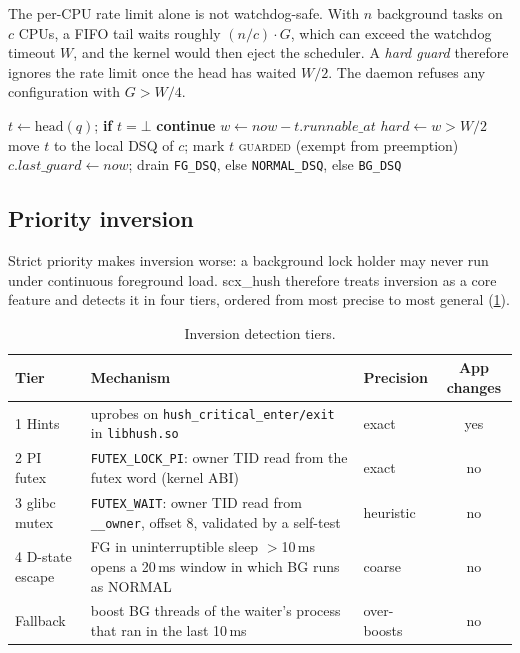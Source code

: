 \documentclass[11pt,a4paper]{article}
\newcommand{\code}[1]{\texttt{#1}}
\begin{document}
The per-CPU rate limit alone is not watchdog-safe. With $n$ background tasks
on $c$ CPUs, a FIFO tail waits roughly $(n/c)\cdot G$, which can exceed the
watchdog timeout $W$, and the kernel would then eject the scheduler. A
\emph{hard guard} therefore ignores the rate limit once the head has waited
$W/2$. The daemon refuses any configuration with $G>W/4$.

\begin{algorithm}[t]
\caption{Starvation guard, run at the top of \code{dispatch} on CPU $c$.}
\label{alg:guard}
\begin{algorithmic}[1]
\For{$q \in \{\code{NORMAL\_DSQ}, \code{BG\_DSQ}\}$}
  \State $t \gets \mathrm{head}(q)$; \textbf{if} $t=\bot$ \textbf{continue}
  \State $w \gets \mathit{now} - t.\mathit{runnable\_at}$
  \State $\mathit{hard} \gets w > W/2$
     \State move $t$ to the local DSQ of $c$; mark $t$ \textsc{guarded} (exempt from preemption)
     \State $c.\mathit{last\_guard} \gets \mathit{now}$; \Return
  \EndIf
\EndFor
\State drain \code{FG\_DSQ}, else \code{NORMAL\_DSQ}, else \code{BG\_DSQ}
\end{algorithmic}
\end{algorithm}

\subsection{Priority inversion}
\label{sec:inversion}
Strict priority makes inversion worse: a background lock holder may never run
under continuous foreground load. scx\_hush therefore treats inversion as a
core feature and detects it in four tiers, ordered from most precise to most
general (\cref{tab:tiers}).

\begin{table}[h]
\centering\small
\caption{Inversion detection tiers.}
\label{tab:tiers}
\begin{tabularx}{\linewidth}{@{}lXlc@{}}
\toprule
Tier & Mechanism & Precision & App changes \\
\midrule
1 Hints & uprobes on \code{hush\_critical\_enter/exit} in \code{libhush.so} & exact & yes \\
2 PI futex & \code{FUTEX\_LOCK\_PI}: owner TID read from the futex word (kernel ABI) & exact & no \\
3 glibc mutex & \code{FUTEX\_WAIT}: owner TID read from \code{\_\_owner}, offset 8, validated by a self-test & heuristic & no \\
4 D-state escape & FG in uninterruptible sleep $>$10\,ms opens a 20\,ms window in which BG runs as NORMAL & coarse & no \\
Fallback & boost BG threads of the waiter's process that ran in the last 10\,ms & over-boosts & no \\
\bottomrule
\end{tabularx}
\end{table}
\end{document}
